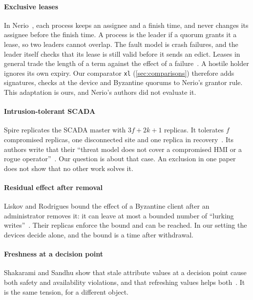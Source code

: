 \paragraph{Exclusive leases}
In Nerio~\cite{vanrenesse2011nerio}, each process keeps an assignee and a finish time, and
never changes its assignee before the finish time. A process is the leader if a quorum
grants it a lease, so two leaders cannot overlap. The fault model is crash failures, and
the leader itself checks that its lease is still valid before it sends an edict. Leases in
general trade the length of a term against the effect of a failure~\cite{gray1989leases}.
A hostile holder ignores its own expiry. Our comparator \texttt{xl} (\cref{sec:comparisons})
therefore adds signatures, checks at the device and Byzantine quorums to Nerio's grantor
rule. This adaptation is ours, and Nerio's authors did not evaluate it.

\paragraph{Intrusion-tolerant SCADA}
Spire replicates the SCADA master with $3f + 2k + 1$ replicas. It tolerates $f$ compromised
replicas, one disconnected site and one replica in recovery~\cite{babay2018spire}. Its
authors write that their ``threat model does not cover a compromised HMI or a rogue
operator''~\cite{babay2018spire}. Our question is about that case. An exclusion in one
paper does not show that no other work solves it.

\paragraph{Residual effect after removal}
Liskov and Rodrigues bound the effect of a Byzantine client after an administrator removes
it: it can leave at most a bounded number of ``lurking writes''~\cite{liskov2005tr}. Their
replicas enforce the bound and can be reached. In our setting the devices decide alone,
and the bound is a time after withdrawal.

\paragraph{Freshness at a decision point}
Shakarami and Sandhu show that stale attribute values at a decision point cause both
safety and availability violations, and that refreshing values helps
both~\cite{shakarami2019refresh}. It is the same tension, for a different object.

